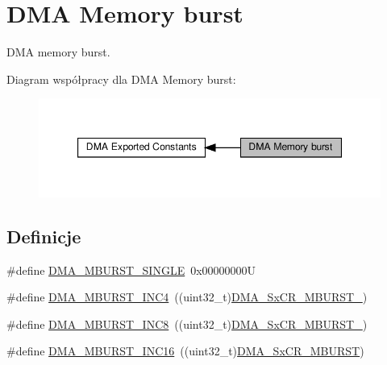 \hypertarget{group___d_m_a___memory__burst}{}\section{D\+MA Memory burst}
\label{group___d_m_a___memory__burst}


D\+MA memory burst.  


Diagram współpracy dla D\+MA Memory burst\+:\nopagebreak
\begin{figure}[H]
\begin{center}
\leavevmode
\includegraphics[width=347pt]{group___d_m_a___memory__burst}
\end{center}
\end{figure}
\subsection*{Definicje}
\begin{DoxyCompactItemize}
\item 
\#define \hyperlink{group___d_m_a___memory__burst_ga4e94b7250e6a4f53d702b42b15796953}{D\+M\+A\+\_\+\+M\+B\+U\+R\+S\+T\+\_\+\+S\+I\+N\+G\+LE}~0x00000000U
\item 
\#define \hyperlink{group___d_m_a___memory__burst_gac9efcb13b2f0a715edb931dde213c000}{D\+M\+A\+\_\+\+M\+B\+U\+R\+S\+T\+\_\+\+I\+N\+C4}~((uint32\+\_\+t)\hyperlink{group___peripheral___registers___bits___definition_ga1e3931a8f14ffe008b8717e1b3232fca}{D\+M\+A\+\_\+\+Sx\+C\+R\+\_\+\+M\+B\+U\+R\+S\+T\+\_})
\item 
\#define \hyperlink{group___d_m_a___memory__burst_ga4b8834930bb3b93cd3fcf04660b6933d}{D\+M\+A\+\_\+\+M\+B\+U\+R\+S\+T\+\_\+\+I\+N\+C8}~((uint32\+\_\+t)\hyperlink{group___peripheral___registers___bits___definition_gaf28eac7212392083bbf1b3d475022b74}{D\+M\+A\+\_\+\+Sx\+C\+R\+\_\+\+M\+B\+U\+R\+S\+T\+\_})
\item 
\#define \hyperlink{group___d_m_a___memory__burst_ga7812aea620b09c4f4281d614d86e6094}{D\+M\+A\+\_\+\+M\+B\+U\+R\+S\+T\+\_\+\+I\+N\+C16}~((uint32\+\_\+t)\hyperlink{group___peripheral___registers___bits___definition_ga5c1174bff38faf5d87b71521bce8f84f}{D\+M\+A\+\_\+\+Sx\+C\+R\+\_\+\+M\+B\+U\+R\+ST})
\end{DoxyCompactItemize}


